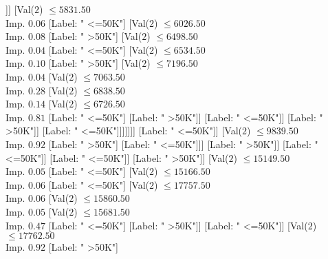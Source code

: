 \documentclass[margin=10pt]{standalone}
\begin{document}
\begin{forest}
																							[Val($2$) $ \leq 3738.50$ \\ Imp. $0.04$
																								[Label: " <=50K"]
																								[Label: " >50K"]]]
																						[Val($2$) $ \leq 5831.50$ \\ Imp. $0.06$
																							[Label: " <=50K"]
																							[Val($2$) $ \leq 6026.50$ \\ Imp. $0.08$
																								[Label: " >50K"]
																								[Val($2$) $ \leq 6498.50$ \\ Imp. $0.04$
																									[Label: " <=50K"]
																									[Val($2$) $ \leq 6534.50$ \\ Imp. $0.10$
																										[Label: " >50K"]
																										[Val($2$) $ \leq 7196.50$ \\ Imp. $0.04$
																											[Val($2$) $ \leq 7063.50$ \\ Imp. $0.28$
																												[Val($2$) $ \leq 6838.50$ \\ Imp. $0.14$
																													[Val($2$) $ \leq 6726.50$ \\ Imp. $0.81$
																														[Label: " <=50K"]
																														[Label: " >50K"]]
																													[Label: " <=50K"]]
																												[Label: " >50K"]]
																											[Label: " <=50K"]]]]]]]
																					[Label: " <=50K"]]
																				[Val($2$) $ \leq 9839.50$ \\ Imp. $0.92$
																					[Label: " >50K"]
																					[Label: " <=50K"]]]
																			[Label: " >50K"]]
																		[Label: " <=50K"]]
																	[Label: " <=50K"]]
																[Label: " >50K"]]
															[Val($2$) $ \leq 15149.50$ \\ Imp. $0.05$
																[Label: " <=50K"]
																[Val($2$) $ \leq 15166.50$ \\ Imp. $0.06$
																	[Label: " <=50K"]
																	[Val($2$) $ \leq 17757.50$ \\ Imp. $0.06$
																		[Val($2$) $ \leq 15860.50$ \\ Imp. $0.05$
																			[Val($2$) $ \leq 15681.50$ \\ Imp. $0.47$
																				[Label: " <=50K"]
																				[Label: " >50K"]]
																			[Label: " <=50K"]]
																		[Val($2$) $ \leq 17762.50$ \\ Imp. $0.92$
																			[Label: " >50K"]

\end{forest}
\end{document}
